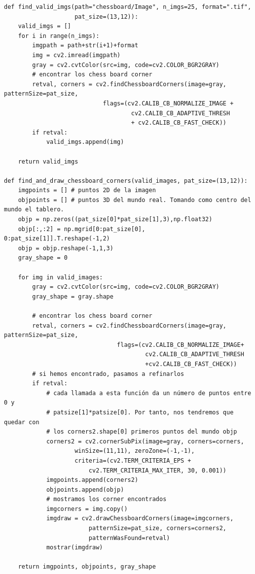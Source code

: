 \documentclass[11pt,a4paper]{article}
\theoremstyle{plain}
\theoremstyle{definition}
\begin{document}
\begin{verbatim}
def find_valid_imgs(path="chessboard/Image", n_imgs=25, format=".tif", 
                    pat_size=(13,12)):
    valid_imgs = []
    for i in range(n_imgs):
        imgpath = path+str(i+1)+format
        img = cv2.imread(imgpath)
        gray = cv2.cvtColor(src=img, code=cv2.COLOR_BGR2GRAY)
        # encontrar los chess board corner
        retval, corners = cv2.findChessboardCorners(image=gray, patternSize=pat_size,
                            flags=(cv2.CALIB_CB_NORMALIZE_IMAGE +
                                    cv2.CALIB_CB_ADAPTIVE_THRESH
                                    + cv2.CALIB_CB_FAST_CHECK))
        if retval:
            valid_imgs.append(img)

    return valid_imgs

def find_and_draw_chessboard_corners(valid_images, pat_size=(13,12)):
    imgpoints = [] # puntos 2D de la imagen
    objpoints = [] # puntos 3D del mundo real. Tomando como centro del mundo el tablero.
    objp = np.zeros((pat_size[0]*pat_size[1],3),np.float32)
    objp[:,:2] = np.mgrid[0:pat_size[0], 0:pat_size[1]].T.reshape(-1,2)
    objp = objp.reshape(-1,1,3)
    gray_shape = 0

    for img in valid_images:
        gray = cv2.cvtColor(src=img, code=cv2.COLOR_BGR2GRAY)
        gray_shape = gray.shape

        # encontrar los chess board corner
        retval, corners = cv2.findChessboardCorners(image=gray, patternSize=pat_size,
                                flags=(cv2.CALIB_CB_NORMALIZE_IMAGE+
                                        cv2.CALIB_CB_ADAPTIVE_THRESH
                                        +cv2.CALIB_CB_FAST_CHECK))
        # si hemos encontrado, pasamos a refinarlos
        if retval:
            # cada llamada a esta función da un número de puntos entre 0 y 
            # patsize[1]*patsize[0]. Por tanto, nos tendremos que quedar con 
            # los corners2.shape[0] primeros puntos del mundo objp
            corners2 = cv2.cornerSubPix(image=gray, corners=corners, 
                    winSize=(11,11), zeroZone=(-1,-1),
                    criteria=(cv2.TERM_CRITERIA_EPS + 
                        cv2.TERM_CRITERIA_MAX_ITER, 30, 0.001))
            imgpoints.append(corners2)
            objpoints.append(objp)
            # mostramos los corner encontrados
            imgcorners = img.copy()
            imgdraw = cv2.drawChessboardCorners(image=imgcorners, 
                        patternSize=pat_size, corners=corners2,
                        patternWasFound=retval)
            mostrar(imgdraw)

    return imgpoints, objpoints, gray_shape
\end{verbatim}
\end{document}
